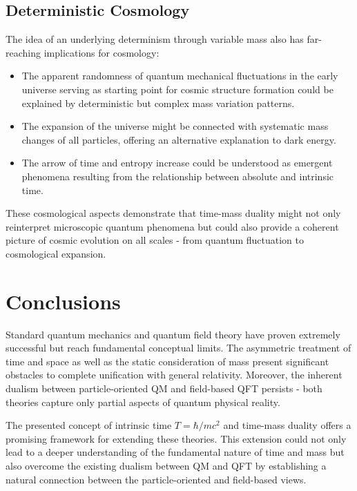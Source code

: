 \documentclass[12pt,a4paper]{article}  %
\begin{document}
	\subsection{Deterministic Cosmology}
	
	The idea of an underlying determinism through variable mass also has far-reaching implications for cosmology:
	
	\begin{itemize}
		\item The apparent randomness of quantum mechanical fluctuations in the early universe serving as starting point for cosmic structure formation could be explained by deterministic but complex mass variation patterns.
		
		\item The expansion of the universe might be connected with systematic mass changes of all particles, offering an alternative explanation to dark energy.
		
		\item The arrow of time and entropy increase could be understood as emergent phenomena resulting from the relationship between absolute and intrinsic time.
	\end{itemize}
	
	These cosmological aspects demonstrate that time-mass duality might not only reinterpret microscopic quantum phenomena but could also provide a coherent picture of cosmic evolution on all scales - from quantum fluctuation to cosmological expansion.
	
	\section{Conclusions}
	
	Standard quantum mechanics and quantum field theory have proven extremely successful but reach fundamental conceptual limits. The asymmetric treatment of time and space as well as the static consideration of mass present significant obstacles to complete unification with general relativity. Moreover, the inherent dualism between particle-oriented QM and field-based QFT persists - both theories capture only partial aspects of quantum physical reality.
	
	The presented concept of intrinsic time $T = \hbar/mc^2$ and time-mass duality offers a promising framework for extending these theories. This extension could not only lead to a deeper understanding of the fundamental nature of time and mass but also overcome the existing dualism between QM and QFT by establishing a natural connection between the particle-oriented and field-based views. 
	
\end{document}
